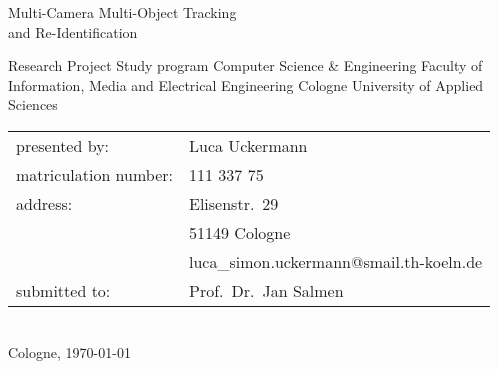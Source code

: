 \begin{titlepage}

\begin{center}
\end{center}

\vspace*{10mm}

\begin{huge}
\noindent
Multi-Camera Multi-Object Tracking\\and Re-Identification\\[10mm]
\end{huge}

Research Project\newline
Study program Computer Science \& Engineering\newline
Faculty of Information, Media and Electrical Engineering\newline
Cologne University of Applied Sciences\\[30mm]

\begin{tabular}{@{}ll}
presented by:           & Luca Uckermann\\
matriculation number:   & 111 337 75\\
address:                & Elisenstr.~29\\
                        & 51149 Cologne\\
                        & luca\_simon.uckermann@smail.th-koeln.de\\[5mm]
submitted to:           & Prof.~Dr.~Jan Salmen\\
\end{tabular}	
\\[10mm]

Cologne, \today

\end{titlepage}